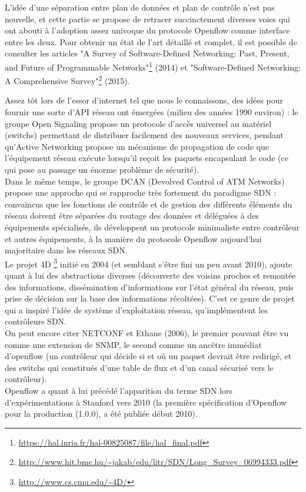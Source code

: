 L'idée d'une séparation entre plan de données et plan de contrôle n'est pas nouvelle, et cette partie se propose de retracer succinctement diverses voies qui ont abouti à l'adoption assez univoque du protocole Openflow comme interface entre les deux. Pour obtenir un état de l'art détaillé et complet, il est possible de consulter les articles "A Survey of Software-Defined Networking: Past, Present, and Future of Programmable Networks"\footnote{\label{histoire}\url{https://hal.inria.fr/hal-00825087/file/hal_final.pdf}} (2014) et "Software-Defined Networking: A Comprehensive Survey"\footnote{\url{http://www.hit.bme.hu/~jakab/edu/litr/SDN/Long_Survey_06994333.pdf}} (2015).


Assez tôt lors de l'essor d'internet tel que nous le connaissons, des idées pour fournir une sorte d'API réseau ont émergées (milieu des années 1990 environ) : le groupe Open Signaling propose un protocole d'accès universel au matériel (switchs) permettant de distribuer facilement des nouveaux services, pendant qu'Active Networking propose un mécanisme de propagation de code que l'équipement réseau exécute lorsqu'il reçoit les paquets encapsulant le code (ce qui pose au passage un énorme problème de sécurité).\\

Dans le même temps, le groupe DCAN (Devolved Control of ATM Networks) propose une approche qui se rapproche très fortement du paradigme SDN : convaincus que les fonctions de contrôle et de gestion des différents éléments du réseau doivent être séparées du routage des données et déléguées à des équipements spécialisés, ils développent un protocole minimaliste entre contrôleur et autres équipements, à la manière du protocole Openflow aujourd'hui majoritaire dans les réseaux SDN.\\

Le projet 4D \footnote{\url{http://www.cs.cmu.edu/~4D/}} initié en 2004 (et semblant s'être fini un peu avant 2010), ajoute quant à lui des abstractions diverses (découverte des voisins proches et remontée des informations, dissémination d'informations sur l'état général du réseau, puis prise de décision sur la base des informations récoltées). C'est ce genre de projet qui a inspiré l'idée de système d'exploitation réseau, qu'implémentent les contrôleurs SDN.\\

On peut encore citer NETCONF et Ethane (2006), le premier pouvant être vu comme une extension de SNMP, le second comme un ancêtre immédiat d'openflow (un contrôleur qui décide si et où un paquet devrait être redirigé, et des switchs qui constitués d'une table de flux et d'un canal sécurisé vers le contrôleur).\\

Openflow a quant à lui précédé l'apparition du terme SDN lors d'expérimentations à Stanford vers 2010 (la première spécification d'Openflow pour la production (1.0.0), a été publiée début 2010).